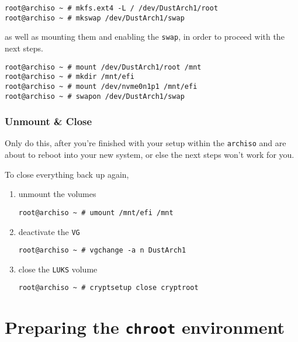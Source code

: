 \documentclass[10pt]{dustdoc}
\begin{document}
\begin{verbatim}
root@archiso ~ # mkfs.ext4 -L / /dev/DustArch1/root
root@archiso ~ # mkswap /dev/DustArch1/swap
\end{verbatim}

\noindent
as well as mounting them and enabling the \texttt{swap}, in order to proceed with the next steps.

\begin{verbatim}
root@archiso ~ # mount /dev/DustArch1/root /mnt
root@archiso ~ # mkdir /mnt/efi
root@archiso ~ # mount /dev/nvme0n1p1 /mnt/efi
root@archiso ~ # swapon /dev/DustArch1/swap
\end{verbatim}

\subsubsection{Unmount \& Close}
\label{sec:unmount-and-close}

\begin{WARNING}
    Only do this, after you’re finished with your setup within the \texttt{archiso} and are about to reboot into your new system, or else the next steps won’t work for you.
\end{WARNING}

To close everything back up again,

\begin{enumerate}
    \item unmount the volumes

        \begin{verbatim}
root@archiso ~ # umount /mnt/efi /mnt
        \end{verbatim}

    \item deactivate the \texttt{VG}

        \begin{verbatim}
root@archiso ~ # vgchange -a n DustArch1
        \end{verbatim}

    \item close the \texttt{LUKS} volume

        \begin{verbatim}
root@archiso ~ # cryptsetup close cryptroot
        \end{verbatim}
\end{enumerate}

\section{Preparing the \texttt{chroot} environment}
\label{sec:preparing-the-chroot-environment}
\end{document}
